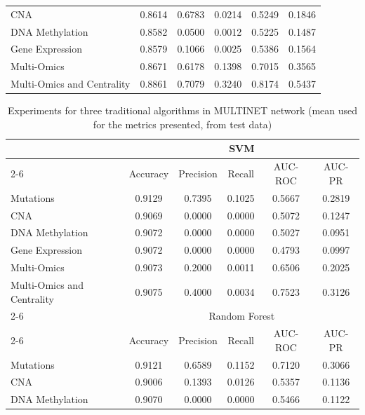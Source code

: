 \documentclass[ppgc, diss, english]{iiufrgs}
\begin{document}
\begin{table}[!th]
\begin{tabular}{lccccc}
CNA                        & 0.8614   & 0.6783    & 0.0214 & 0.5249  & 0.1846 \\
DNA Methylation            & 0.8582   & 0.0500    & 0.0012 & 0.5225  & 0.1487 \\
Gene Expression            & 0.8579   & 0.1066    & 0.0025 & 0.5386  & 0.1564 \\
Multi-Omics                & 0.8671   & 0.6178    & 0.1398 & 0.7015  & 0.3565 \\
Multi-Omics and Centrality & 0.8861   & 0.7079    & 0.3240 & 0.8174  & 0.5437 \\ \hline
\end{tabular}
\end{table}


\begin{table}[!th]
\caption{Experiments for three traditional algorithms in MULTINET network (mean used for the metrics presented, from test data) \label{tab:completa_trad_multinet}}
\centering
\begin{tabular}{lccccc}
\hline
                           & \multicolumn{5}{c}{SVM}                          \\ \cline{2-6} 
                           & Accuracy & Precision & Recall & AUC-ROC & AUC-PR \\
Mutations                  & 0.9129   & 0.7395    & 0.1025 & 0.5667  & 0.2819 \\
CNA                        & 0.9069   & 0.0000    & 0.0000 & 0.5072  & 0.1247 \\
DNA Methylation            & 0.9072   & 0.0000    & 0.0000 & 0.5027  & 0.0951 \\
Gene Expression            & 0.9072   & 0.0000    & 0.0000 & 0.4793  & 0.0997 \\
Multi-Omics                & 0.9073   & 0.2000    & 0.0011 & 0.6506  & 0.2025 \\
Multi-Omics and Centrality & 0.9075   & 0.4000    & 0.0034 & 0.7523  & 0.3126 \\ \cline{2-6} 
                           & \multicolumn{5}{c}{Random Forest}                \\ \cline{2-6} 
                           & Accuracy & Precision & Recall & AUC-ROC & AUC-PR \\
Mutations                  & 0.9121   & 0.6589    & 0.1152 & 0.7120  & 0.3066 \\
CNA                        & 0.9006   & 0.1393    & 0.0126 & 0.5357  & 0.1136 \\
DNA Methylation            & 0.9070   & 0.0000    & 0.0000 & 0.5466  & 0.1122 \\

\end{tabular}
\end{table}
\end{document}
